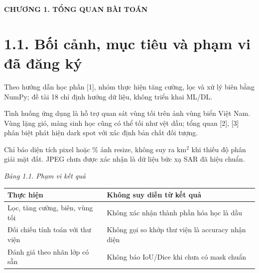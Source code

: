 \documentclass[12pt,a4paper]{extreport}
\begin{document}

\setcounter{page}{5}
\begin{center}\Large\bfseries CHƯƠNG 1. TỔNG QUAN BÀI TOÁN\end{center}
\section*{1.1. Bối cảnh,\allowbreak{} mục tiêu và phạm vi đã đăng ký}
Theo hướng dẫn học phần [1],\allowbreak{} nhóm thực hiện tăng cường,\allowbreak{} lọc và xử lý biên bằng NumPy; đề tài 18 chỉ định hướng dữ liệu,\allowbreak{} không triển khai ML/\allowbreak{}DL.
\par
Tình huống ứng dụng là hỗ trợ quan sát vùng tối trên ảnh vùng biển Việt Nam. Vùng lặng gió,\allowbreak{} màng sinh học cũng có thể tối như vệt dầu; tổng quan [2],\allowbreak{} [3] phân biệt phát hiện dark spot với xác định bản chất đối tượng.
\par
Chỉ báo diện tích pixel hoặc \% ảnh resize,\allowbreak{} không suy ra km\ensuremath{{}^2} khi thiếu độ phân giải mặt đất. JPEG chưa được xác nhận là dữ liệu bức xạ SAR đã hiệu chuẩn.
\par
{\fontsize{10.5}{12}\selectfont\textit{Bảng 1.1. Phạm vi kết quả}
\begin{longtable}{>{\raggedright\arraybackslash}p{7.693cm}|>{\raggedright\arraybackslash}p{7.693cm}}
\textbf{Thực hiện} & \textbf{Không suy diễn từ kết quả}\\\hline
\endhead
Lọc,\allowbreak{} tăng cường,\allowbreak{} biên,\allowbreak{} vùng tối & Không xác nhận thành phần hóa học là dầu\\\hline
Đối chiếu tính toán với thư viện & Không gọi so khớp thư viện là accuracy nhận diện\\\hline
Đánh giá theo nhãn lớp có sẵn & Không báo IoU/\allowbreak{}Dice khi chưa có mask chuẩn\\\hline
\end{longtable}}
\end{document}
